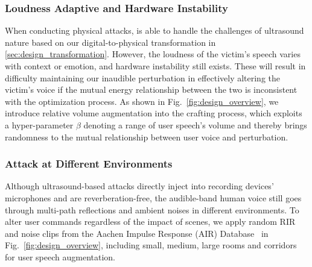 \subsubsection{Loudness Adaptive and Hardware Instability} When conducting physical attacks, \alias is able to handle the challenges of ultrasound nature based on our digital-to-physical transformation in \textsection\ref{sec:design_transformation}. However, the loudness of the victim's speech varies with context or emotion, and hardware instability still exists.
These will result in difficulty maintaining our inaudible perturbation in effectively altering the victim's voice if the mutual energy relationship between the two is inconsistent with the optimization process.
As shown in Fig.~\ref{fig:design_overview}, we introduce relative volume augmentation into the crafting process, which exploits a hyper-parameter $\beta$ denoting a range of user speech's volume and thereby brings randomness to the mutual relationship between user voice and perturbation.

\subsubsection{Attack at Different Environments} Although ultrasound-based attacks directly inject into recording devices' microphones and are reverberation-free, the audible-band human voice still goes through multi-path reflections and ambient noises in different environments. To alter user commands regardless of the impact of scenes, we apply random RIR and noise clips from the Aachen Impulse Response (AIR) Database~\cite{jeub2009binaural} in Fig.~\ref{fig:design_overview}, including small, medium, large rooms and corridors for user speech augmentation.

